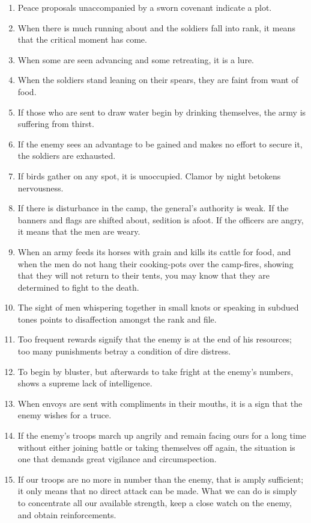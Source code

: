 \documentclass[oneside]{book}
\begin{document}
\begin{enumerate}
	\item Peace proposals unaccompanied by a sworn covenant indicate a plot.
	\item When there is much running about and the soldiers fall into rank, it means that the critical moment has come.
	\item When some are seen advancing and some retreating, it is a lure.
	\item When the soldiers stand leaning on their spears, they are faint from want of food.
	\item If those who are sent to draw water begin by drinking themselves, the army is suffering from thirst.
	\item If the enemy sees an advantage to be gained and makes no effort to secure it, the soldiers are exhausted.
	\item If birds gather on any spot, it is unoccupied. Clamor by night betokens nervousness.
	\item If there is disturbance in the camp, the general's authority is weak. If the banners and flags are shifted about, sedition is afoot. If the officers are angry, it means that the men are weary.
	\item When an army feeds its horses with grain and kills its cattle for food, and when the men do not hang their cooking-pots over the camp-fires, showing that they will not return to their tents, you may know that they are determined to fight to the death.
	\item The sight of men whispering together in small knots or speaking in subdued tones points to disaffection amongst the rank and file.
	\item Too frequent rewards signify that the enemy is at the end of his resources; too many punishments betray a condition of dire distress.
	\item To begin by bluster, but afterwards to take fright at the enemy's numbers, shows a supreme lack of intelligence.
	\item When envoys are sent with compliments in their mouths, it is a sign that the enemy wishes for a truce.
	\item If the enemy's troops march up angrily and remain facing ours for a long time without either joining battle or taking themselves off again, the situation is one that demands great vigilance and circumspection.
	\item If our troops are no more in number than the enemy, that is amply sufficient; it only means that no direct attack can be made. What we can do is simply to concentrate all our available strength, keep a close watch on the enemy, and obtain reinforcements.

\end{enumerate}
\end{document}
